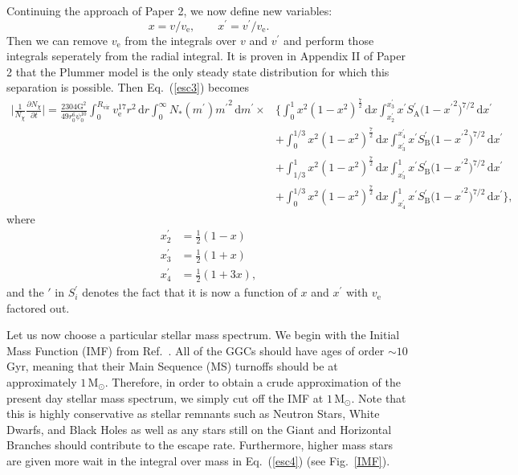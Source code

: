 \documentclass[aps,floatfix,prd,showpacs]{revtex4}
\newcommand{\diff}{\mathrm{d}}
\newcommand{\vesc}{v_{\text{e}}}
\newcommand{\vp}{v^\prime}
\newcommand{\mpr}{m^\prime}
\newcommand{\xp}{x^\prime}
\newcommand{\SA}{S_{\text{A}}}
\newcommand{\SB}{S_{\text{B}}}
\newcommand{\G}{\text{G}}
\newcommand{\Nx}{N_\chi}
\newcommand{\Rvir}{R_{\mathrm{vir}}}
\newcommand{\Msun}{\textrm{M}_\odot}
\begin{document}
Continuing the approach of Paper 2, we now define new variables: 
%
\begin{equation} 
	x = v/\vesc, \qquad \xp = \vp/\vesc.	
\end{equation}
%
%
Then we can remove $\vesc$ from the integrals over $v$ and $\vp$ and perform those integrals seperately from the radial integral.  It is proven in Appendix II of Paper 2 that the Plummer model is the only steady state distribution for which this separation is possible.  Then Eq.~(\ref{esc3}) becomes
%
\begin{equation}
\label{esc4}
\begin{split}
\bigg|\frac{1}{\Nx}\frac{\partial \Nx}{\partial t}\bigg| = \frac{2304\G^2}{49 r_0^6\psi_0^{10}}\int^{\Rvir}_0{\vesc^{17}r^2}\,\diff r\int^\infty_0{N_*(\mpr)\mpr}^2\,\diff \mpr \times &\Bigg\{ \int^1_0{x^2(1 - x^2)^\frac{7}{2}}\,\diff x\int^{\xp_3}_{\xp_2}{\xp \SA^\prime{(1-{\xp}^2})^{7/2}}\,\diff \xp \\
&+ \int^{1/3}_0{x^2(1 - x^2)^\frac{7}{2}}\,\diff x\int^{\xp_4}_{\xp_3} {\xp \SB^\prime{(1-{\xp}^2})^{7/2}}\,\diff \xp \\ &+ \int^1_{1/3}{x^2(1 - x^2)^\frac{7}{2}}\,\diff x\int^1_{x_3^\prime}{\xp \SB^\prime{(1-{\xp}^2})^{7/2}}\,\diff \xp \\
&+ \int^{1/3}_0{x^2(1 - {x}^2)^\frac{7}{2}}\,\diff x\int^1_{\xp_4}{\xp \SB^\prime{(1-{\xp}^2})^{7/2}}\,\diff \xp\Bigg\},
\end{split}
\end{equation}
%
%
where
%
\begin{equation}
\begin{split}
	\xp_2 &= \frac{1}{2}(1 - x) \\
	\xp_3 &= \frac{1}{2}(1 + x) \\
	\xp_4 &= \frac{1}{2}(1 + 3x),
\end{split}
\end{equation}
%
%
and the $\prime$ in $S_i^\prime$ denotes the fact that it is now a function of $x$ and $\xp$ with $\vesc$ factored out.

Let us now choose a particular stellar mass spectrum.  We begin with the Initial Mass Function (IMF) from Ref.~\cite{Kroupa2001}.  All of the GGCs should have ages of order $\sim10$ Gyr, meaning that their Main Sequence (MS) turnoffs should be at approximately $1\, \Msun$.  Therefore, in order to obtain a crude approximation of the present day stellar mass spectrum, we simply cut off the IMF at $1\, \Msun$.  Note that this is highly conservative as stellar remnants such as Neutron Stars, White Dwarfs, and Black Holes as well as any stars still on the Giant and Horizontal Branches should contribute to the escape rate.  Furthermore, higher mass stars are given more wait in the integral over mass in Eq.~(\ref{esc4}) (see Fig.~\ref{IMF}).
\end{document}
